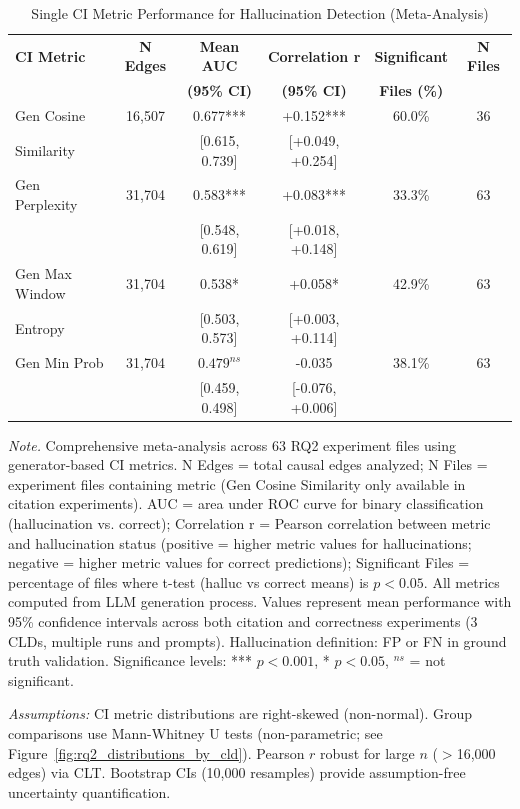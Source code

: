 \begin{table}[H]
\centering
\caption{Single CI Metric Performance for Hallucination Detection (Meta-Analysis)}
\label{tab:rq2_single_metrics}
\begin{threeparttable}
\begin{tabular}{lccccc}
\toprule
\textbf{CI Metric} & \textbf{N Edges} & \textbf{Mean AUC} & \textbf{Correlation r} & \textbf{Significant} & \textbf{N Files} \\
 & & \textbf{(95\% CI)} & \textbf{(95\% CI)} & \textbf{Files (\%)} & \\
\midrule
Gen Cosine            & 16,507 & 0.677*** & +0.152*** & 60.0\% & 36 \\
Similarity            &        & [0.615, 0.739] & [+0.049, +0.254] & & \\
\midrule
Gen Perplexity        & 31,704 & 0.583*** & +0.083*** & 33.3\% & 63 \\
                      &        & [0.548, 0.619] & [+0.018, +0.148] & & \\
\midrule
Gen Max Window        & 31,704 & 0.538* & +0.058* & 42.9\% & 63 \\
Entropy               &        & [0.503, 0.573] & [+0.003, +0.114] & & \\
\midrule
Gen Min Prob          & 31,704 & $0.479^{ns}$ & -0.035 & 38.1\% & 63 \\
                      &        & [0.459, 0.498] & [-0.076, +0.006] & & \\
\bottomrule
\end{tabular}
\begin{tablenotes}
\small
\item \textit{Note.} Comprehensive meta-analysis across 63 RQ2 experiment files using generator-based CI metrics. 
N Edges = total causal edges analyzed; N Files = experiment files containing metric (Gen Cosine Similarity only available in citation experiments).
AUC = area under ROC curve for binary classification (hallucination vs. correct); 
Correlation r = Pearson correlation between metric and hallucination status (positive = higher metric values for hallucinations; negative = higher metric values for correct predictions); 
Significant Files = percentage of files where t-test (halluc vs correct means) is $p < 0.05$. 
All metrics computed from LLM generation process. 
Values represent mean performance with 95\% confidence intervals across both citation and correctness experiments (3 CLDs, multiple runs and prompts). 
Hallucination definition: FP or FN in ground truth validation.
Significance levels: *** $p<0.001$, * $p<0.05$, $^{ns}$ = not significant.
\item \textit{Assumptions:} CI metric distributions are right-skewed (non-normal). Group comparisons use Mann-Whitney U tests (non-parametric; see Figure~\ref{fig:rq2_distributions_by_cld}). Pearson $r$ robust for large $n$ ($>$16{,}000 edges) via CLT. Bootstrap CIs (10{,}000 resamples) provide assumption-free uncertainty quantification.
\end{tablenotes}
\end{threeparttable}
\end{table}

